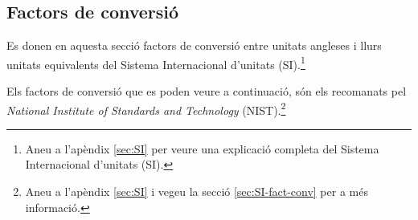 \subsection{Factors de conversió}

Es donen en aquesta secció factors de conversió entre unitats angleses i llurs unitats equivalents del Sistema Internacional d'unitats (SI).\footnote{Aneu a l'apèndix \ref{sec:SI} per veure una explicació completa del Sistema Internacional d'unitats (SI).}

Els factors de conversió que es poden veure a continuació, són els recomanats pel \textit{National Institute of Standards and Technology} (NIST).\footnote{Aneu a l'apèndix \ref{sec:SI} i vegeu la secció \ref{sec:SI-fact-conv} per a més informació.}

